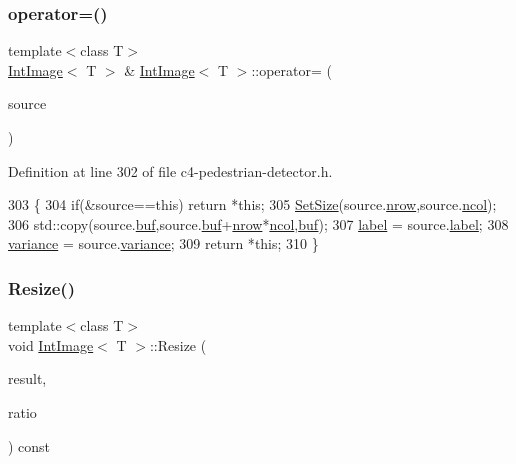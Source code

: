 \subsubsection{\texorpdfstring{operator=()}{operator=()}}
{\footnotesize\ttfamily template$<$class T$>$ \\
\mbox{\hyperlink{class_int_image}{Int\+Image}}$<$ T $>$ \& \mbox{\hyperlink{class_int_image}{Int\+Image}}$<$ T $>$\+::operator= (\begin{DoxyParamCaption}\item[{const \mbox{\hyperlink{class_int_image}{Int\+Image}}$<$ T $>$ \&}]{source }\end{DoxyParamCaption})}



Definition at line 302 of file c4-\/pedestrian-\/detector.\+h.


\begin{DoxyCode}
303 \{
304     \textcolor{keywordflow}{if}(&source==\textcolor{keyword}{this}) \textcolor{keywordflow}{return} *\textcolor{keyword}{this};
305     \mbox{\hyperlink{class_int_image_a89eb8fac3fde8d3ce392e5f28c14f8b0}{SetSize}}(source.\mbox{\hyperlink{class_array2d_c_a12f690f7195f7674a86a7e1eedbc473c}{nrow}},source.\mbox{\hyperlink{class_array2d_c_a27e0f8f40f644831cd7c750db59dc28a}{ncol}});
306     std::copy(source.\mbox{\hyperlink{class_array2d_c_a25d8fa5049d4c7ded126e0acdd18f37a}{buf}},source.\mbox{\hyperlink{class_array2d_c_a25d8fa5049d4c7ded126e0acdd18f37a}{buf}}+\mbox{\hyperlink{class_array2d_c_a12f690f7195f7674a86a7e1eedbc473c}{nrow}}*\mbox{\hyperlink{class_array2d_c_a27e0f8f40f644831cd7c750db59dc28a}{ncol}},\mbox{\hyperlink{class_array2d_c_a25d8fa5049d4c7ded126e0acdd18f37a}{buf}});
307     \mbox{\hyperlink{class_int_image_aeeeaa5da82f21cdc95ab3f941aa405e7}{label}} = source.\mbox{\hyperlink{class_int_image_aeeeaa5da82f21cdc95ab3f941aa405e7}{label}};
308     \mbox{\hyperlink{class_int_image_a2da0267dc732e9e4149e70a05f744fb6}{variance}} = source.\mbox{\hyperlink{class_int_image_a2da0267dc732e9e4149e70a05f744fb6}{variance}};
309     \textcolor{keywordflow}{return} *\textcolor{keyword}{this};
310 \}
\end{DoxyCode}
\mbox{\label{class_int_image_a6eb852d06d8365476dba0760d9319e59}} 
\subsubsection{\texorpdfstring{Resize()}{Resize()}\hspace{0.1cm}{\footnotesize\ttfamily [1/2]}}
{\footnotesize\ttfamily template$<$class T$>$ \\
void \mbox{\hyperlink{class_int_image}{Int\+Image}}$<$ T $>$\+::Resize (\begin{DoxyParamCaption}\item[{\mbox{\hyperlink{class_int_image}{Int\+Image}}$<$ T $>$ \&}]{result,  }\item[{const \mbox{\hyperlink{c4-pedestrian-detector_8h_a5821460e95a0800cf9f24c38915cbbde}{R\+E\+AL}}}]{ratio }\end{DoxyParamCaption}) const}



